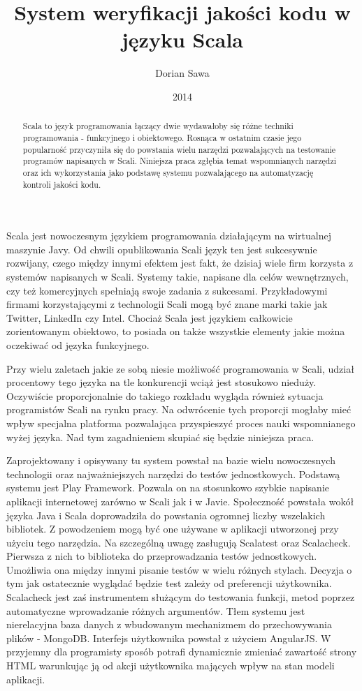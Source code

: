 \documentclass[brudnopis]{xmgr}
\author   {Dorian Sawa}
\title    {System weryfikacji jakości kodu w języku Scala}
\date     {2014}
\begin{document}
\begin{abstract}
 Scala to język programowania łączący dwie wydawałoby się różne techniki programowania - funkcyjnego i obiektowego. 
Rosnąca w ostatnim czasie jego popularność przyczyniła się do powstania wielu narzędzi pozwalających na testowanie 
programów napisanych w Scali. Niniejsza praca zgłębia temat wspomnianych narzędzi oraz ich wykorzystania jako podstawę 
systemu pozwalającego na automatyzację kontroli jakości kodu.
\end{abstract}

\maketitle
%
\introduction Scala jest nowoczesnym językiem programowania działającym na wirtualnej maszynie Javy. Od chwili opublikowania Scali język ten jest sukcesywnie rozwijany, czego między innymi efektem jest fakt, że dzisiaj wiele firm korzysta z systemów napisanych w Scali. Systemy takie, napisane dla celów wewnętrznych, czy też komercyjnych spełniają swoje zadania z sukcesami. Przykładowymi firmami korzystającymi z technologii Scali mogą być znane marki takie jak Twitter, LinkedIn czy Intel. Chociaż Scala jest językiem całkowicie zorientowanym obiektowo, to posiada on także wszystkie elementy jakie można oczekiwać od języka funkcyjnego. 

Przy wielu zaletach jakie ze sobą niesie możliwość programowania w Scali, udział procentowy tego języka na tle konkurencji wciąż jest stosukowo nieduży. Oczywiście proporcjonalnie do takiego rozkładu wygląda również sytuacja programistów Scali na rynku pracy. Na odwrócenie tych proporcji mogłaby mieć wpływ specjalna platforma pozwalająca  przyspieszyć proces nauki wspomnianego wyżej języka. Nad tym zagadnieniem skupiać się będzie niniejsza praca. 

Zaprojektowany i opisywany tu system powstał na bazie wielu nowoczesnych technologii oraz najważniejszych narzędzi do testów jednostkowych. Podstawą systemu jest Play Framework. Pozwala on na stosunkowo szybkie napisanie aplikacji internetowej zarówno w Scali jak i w Javie. Społeczność powstała wokół języka Java i Scala doprowadziła do powstania ogromnej liczby wszelakich bibliotek. Z powodzeniem mogą być one używane w aplikacji utworzonej przy użyciu tego narzędzia. 
Na szczególną uwagę zasługują Scalatest oraz Scalacheck. Pierwsza z nich to biblioteka do przeprowadzania testów jednostkowych. Umożliwia ona między innymi pisanie testów w wielu różnych stylach. Decyzja o tym jak ostatecznie wyglądać będzie test zależy od preferencji użytkownika. Scalacheck jest zaś instrumentem służącym do testowania funkcji, metod poprzez automatyczne wprowadzanie różnych argumentów. Tłem systemu jest nierelacyjna baza danych z wbudowanym mechanizmem do przechowywania plików - MongoDB. Interfejs użytkownika powstał z użyciem AngularJS. W przyjemny dla programisty sposób  potrafi dynamicznie zmieniać zawartość strony HTML warunkując ją od akcji użytkownika mających wpływ na stan modeli aplikacji. 
\end{document}
